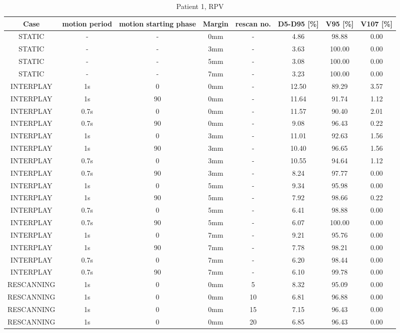 \begin{table}[H]
  \centering
  \tiny
  \caption{Patient 1, RPV}
  \begin{tabular}{|c||c|c|c|c||c|c|c|}
    \hline\hline
    Case & motion period & motion starting phase & Margin & rescan no. & D5-D95 [\%] & V95 [\%] & V107 [\%] \\
    \hline 
STATIC & - & - & 0mm & - & 4.86 & 98.88 & 0.00 \\
STATIC & - & - & 3mm & - & 3.63 & 100.00 & 0.00 \\
STATIC & - & - & 5mm & - & 3.08 & 100.00 & 0.00 \\
STATIC & - & - & 7mm & - & 3.23 & 100.00 & 0.00 \\
INTERPLAY & 1s & 0 & 0mm & - & 12.50 & 89.29 & 3.57 \\
INTERPLAY & 1s & 90 & 0mm & - & 11.64 & 91.74 & 1.12 \\
INTERPLAY & 0.7s & 0 & 0mm & - & 11.57 & 90.40 & 2.01 \\
INTERPLAY & 0.7s & 90 & 0mm & - & 9.08 & 96.43 & 0.22 \\
INTERPLAY & 1s & 0 & 3mm & - & 11.01 & 92.63 & 1.56 \\
INTERPLAY & 1s & 90 & 3mm & - & 10.40 & 96.65 & 1.56 \\
INTERPLAY & 0.7s & 0 & 3mm & - & 10.55 & 94.64 & 1.12 \\
INTERPLAY & 0.7s & 90 & 3mm & - & 8.24 & 97.77 & 0.00 \\
INTERPLAY & 1s & 0 & 5mm & - & 9.34 & 95.98 & 0.00 \\
INTERPLAY & 1s & 90 & 5mm & - & 7.92 & 98.66 & 0.22 \\
INTERPLAY & 0.7s & 0 & 5mm & - & 6.41 & 98.88 & 0.00 \\
INTERPLAY & 0.7s & 90 & 5mm & - & 6.07 & 100.00 & 0.00 \\
INTERPLAY & 1s & 0 & 7mm & - & 9.21 & 95.76 & 0.00 \\
INTERPLAY & 1s & 90 & 7mm & - & 7.78 & 98.21 & 0.00 \\
INTERPLAY & 0.7s & 0 & 7mm & - & 6.20 & 98.44 & 0.00 \\
INTERPLAY & 0.7s & 90 & 7mm & - & 6.10 & 99.78 & 0.00 \\
RESCANNING & 1s & 0 & 0mm & 5 & 8.32 & 95.09 & 0.00 \\
RESCANNING & 1s & 0 & 0mm & 10 & 6.81 & 96.88 & 0.00 \\
RESCANNING & 1s & 0 & 0mm & 15 & 7.15 & 96.43 & 0.00 \\
RESCANNING & 1s & 0 & 0mm & 20 & 6.85 & 96.43 & 0.00 \\

\end{tabular}
\end{table}
